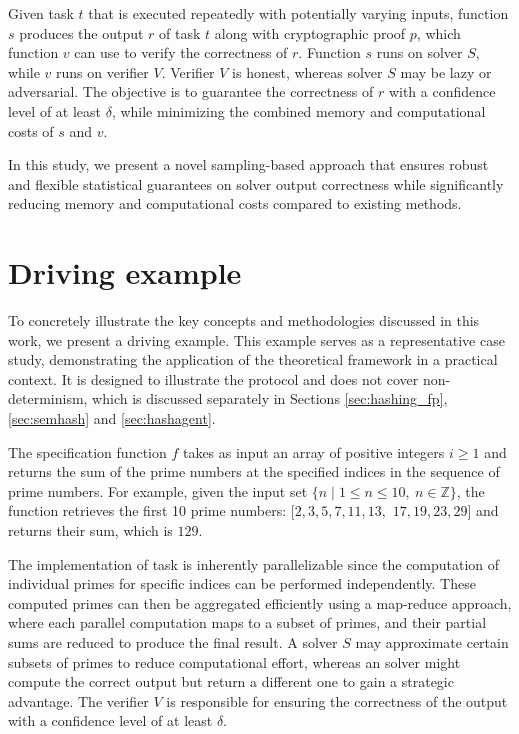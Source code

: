 \documentclass[sigconf, nonacm]{acmart}
\begin{document}
\begin{problem}
\label{problem:1}
Given task $t$ that is executed repeatedly with potentially varying inputs, function $s$ produces the output $r$ of task $t$ along with cryptographic proof $p$, which function $v$ can use to verify the correctness of $r$. Function $s$ runs on solver $S$, while $v$ runs on verifier $V$. Verifier $V$ is honest, whereas solver $S$ may be lazy or adversarial. The objective is to guarantee the correctness of $r$ with a confidence level of at least $\delta$, while minimizing the combined memory and computational costs of $s$ and $v$.
\end{problem}

In this study, we present a novel sampling-based approach that ensures robust and flexible statistical guarantees on solver output correctness while significantly reducing memory and computational costs compared to existing methods.

\section{Driving example}
\label{sec:drivingex}

To concretely illustrate the key concepts and methodologies discussed in this work, we present a driving example. This example serves as a representative case study, demonstrating the application of the theoretical framework in a practical context. It is designed to illustrate the protocol and does not cover non-determinism, which is discussed separately in Sections \ref{sec:hashing_fp}, \ref{sec:semhash} and \ref{sec:hashagent}.

\begin{texample}
  The specification function $f$ takes as input an array of positive integers $i \geq 1$ and returns the sum of the prime numbers at the specified indices in the sequence of prime numbers. For example, given the input set $ \{ n \mid 1 \leq n \leq 10, \ n \in \mathbb{Z} \} $, the function retrieves the first 10 prime numbers: $[2, 3, 5, 7, 11, 13,$ $17, 19, 23, 29]$ and returns their sum, which is $129$.

\end{texample}

The implementation of task  is inherently parallelizable since the computation of individual primes for specific indices can be performed independently. These computed primes can then be aggregated efficiently using a map-reduce approach, where each parallel computation maps to a subset of primes, and their partial sums are reduced to produce the final result. A  solver $S$ may approximate certain subsets of primes to reduce computational effort, whereas an  solver might compute the correct output but return a different one to gain a strategic advantage. The verifier $V$ is responsible for ensuring the correctness of the output with a confidence level of at least $\delta$.
\end{document}
